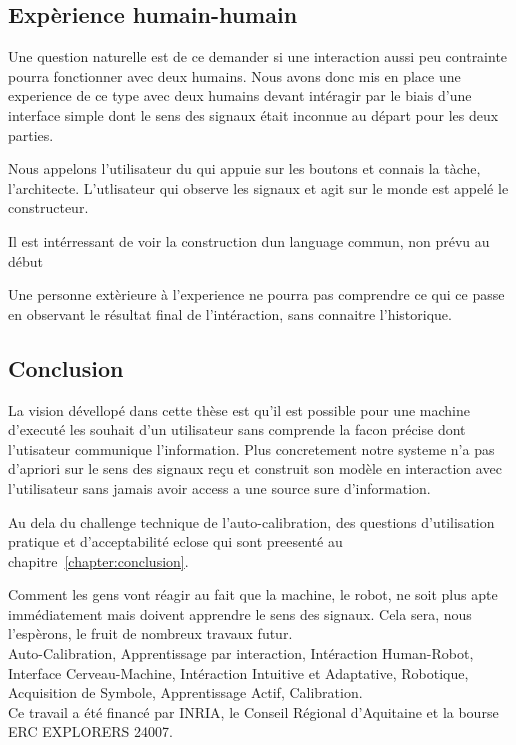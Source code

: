 \subsection*{Expèrience humain-humain}

Une question naturelle est de ce demander si une interaction aussi peu contrainte pourra fonctionner avec deux humains. Nous avons donc mis en place une experience de ce type avec deux humains devant intéragir par le biais d'une interface simple dont le sens des signaux était inconnue au départ pour les deux parties.

Nous appelons l'utilisateur du qui appuie sur les boutons et connais la tàche, l'architecte. L'utlisateur qui observe les signaux et agit sur le monde est appelé le constructeur.

Il est intérressant de voir la construction dun language commun, non prévu au début

Une personne extèrieure à l'experience ne pourra pas comprendre ce qui ce passe en observant le résultat final de l'intéraction, sans connaitre l'historique.

\subsection*{Conclusion}

La vision dévellopé dans cette thèse est qu'il est possible pour une machine d'executé les souhait d'un utilisateur sans comprende la facon précise dont l'utisateur communique l'information. Plus concretement notre systeme n'a pas d'apriori sur le sens des signaux reçu et construit son modèle en interaction avec l'utilisateur sans jamais avoir access a une source sure d'information.

Au dela du challenge technique de l'auto-calibration, des questions d'utilisation pratique et d'acceptabilité eclose qui sont preesenté au chapitre~\ref{chapter:conclusion}.

Comment les gens vont réagir au fait que la machine, le robot, ne soit plus apte immédiatement mais doivent apprendre le sens des signaux. Cela sera, nous l'espèrons, le fruit de nombreux travaux futur.\\

 Auto-Calibration, Apprentissage par interaction, Intéraction Human-Robot, Interface Cerveau-Machine, Intéraction Intuitive et Adaptative, Robotique, Acquisition de Symbole, Apprentissage Actif, Calibration.\\

Ce travail a été financé par INRIA, le Conseil R\'egional d'Aquitaine et la bourse ERC EXPLORERS 24007.
